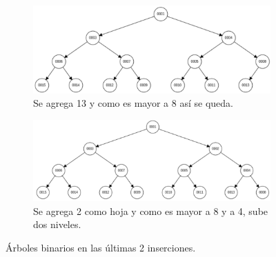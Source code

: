 \documentclass[12pt]{article}
\begin{document}
\begin{figure}
\begin{subfigure}{.9\textwidth}
	\centering
	\includegraphics[width=1.2\linewidth]{hp014}
	\caption{Se agrega 13 y como es mayor a 8 así se queda. }
	\label{fig:sfig14}
\end{subfigure}
\begin{subfigure}{.9\textwidth}
	\centering
	\includegraphics[width=1.2\linewidth]{hp015}
	\caption{Se agrega 2 como hoja y como es mayor a 8 y a 4, sube dos niveles.}
	\label{fig:sfig15}
\end{subfigure}
	\caption{Árboles binarios en las últimas 2 inserciones.}
	\label{fig:fig__}
\end{figure}
\end{document}
